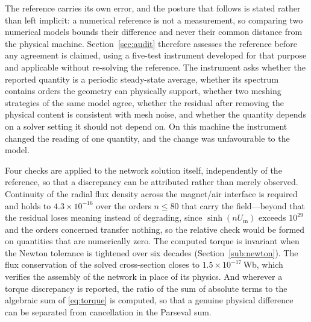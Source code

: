 \documentclass[10pt,a4paper,twocolumn]{article}
\newcommand{\Um}{U_{\mathrm{m}}}
\theoremstyle{plain}
\theoremstyle{remark}
\begin{document}
The reference carries its own error, and the posture that follows is
stated rather than left implicit: a numerical reference is not a
measurement, so comparing two numerical models bounds their difference
and never their common distance from the physical machine.
Section~\ref{sec:audit} therefore assesses the reference before any
agreement is claimed, using a five-test instrument developed for that
purpose and applicable without re-solving the reference. The instrument
asks whether the reported quantity is a periodic steady-state average,
whether its spectrum contains orders the geometry can physically
support, whether two meshing strategies of the same model agree, whether
the residual after removing the physical content is consistent with mesh
noise, and whether the quantity depends on a solver setting it should
not depend on. On this machine the instrument changed the reading of one
quantity, and the change was unfavourable to the model.

Four checks are applied to the network solution itself, independently of
the reference, so that a discrepancy can be attributed rather than
merely observed. Continuity of the radial flux density across the
magnet/air interface is required and holds to $4.3\times10^{-16}$ over
the orders $n\le80$ that carry the field---beyond that the residual
loses meaning instead of degrading, since $\sinh(n\Um)$ exceeds
$10^{29}$ and the orders concerned transfer nothing, so the relative
check would be formed on quantities that are numerically zero. The
computed torque is invariant when the Newton tolerance is tightened over
six decades (Section~\ref{sub:newton}). The flux conservation of the
solved cross-section closes to $1.5\times10^{-17}$\,Wb, which verifies
the assembly of the network in place of its physics. And wherever a
torque discrepancy is reported, the ratio of the sum of absolute terms
to the algebraic sum of \eqref{eq:torque} is computed, so that a genuine
physical difference can be separated from cancellation in the Parseval
sum.
\end{document}
